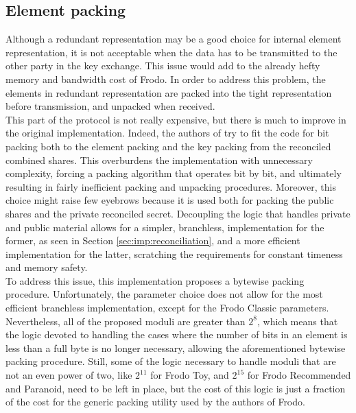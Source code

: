 \subsection{Element packing}
Although a redundant representation may be a good choice for internal element representation, it is not acceptable when the data has to be transmitted to the other party in the key exchange. This issue would add to the already hefty memory and bandwidth cost of Frodo. In order to address this problem, the elements in redundant representation are packed into the tight representation before transmission, and unpacked when received.\\
This part of the protocol is not really expensive, but there is much to improve in the original implementation. Indeed, the authors of \cite{frodo} try to fit the code for bit packing both to the element packing and the key packing from the reconciled combined shares. This overburdens the implementation with unnecessary complexity, forcing a packing algorithm that operates bit by bit, and ultimately resulting in fairly inefficient packing and unpacking procedures. Moreover, this choice might raise few eyebrows because it is used both for packing the public shares and the private reconciled secret. Decoupling the logic that handles private and public material allows for a simpler, branchless, implementation for the former, as seen in Section \ref{sec:imp:reconciliation}, and a more efficient implementation for the latter, scratching the requirements for constant timeness and memory safety.\\
To address this issue, this implementation proposes a bytewise packing procedure. Unfortunately, the parameter choice does not allow for the most efficient branchless implementation, except for the Frodo Classic parameters. Nevertheless, all of the proposed moduli are greater than $2^8$, which means that the logic devoted to handling the cases where the number of bits in an element is less than a full byte is no longer necessary, allowing the aforementioned bytewise packing procedure. Still, some of the logic necessary to handle moduli that are not an even power of two, like $2^11$ for Frodo Toy, and $2^15$ for Frodo Recommended and Paranoid, need to be left in place, but the cost of this logic is just a  fraction of the cost for the generic packing utility used by the authors of Frodo.

